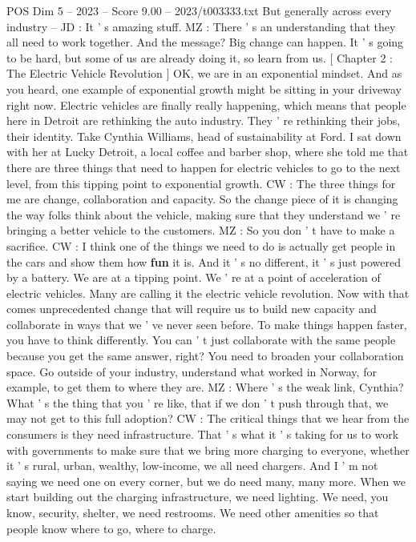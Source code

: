 \begin{textsample}{POS Dim 5 – 2023 – Score 9.00 – 2023/t003333.txt}
But generally across every industry -- JD : It ' s amazing stuff.
MZ : There ' s an understanding that they all need to work together.
And the message?
Big change can happen.
It ' s going to be hard, but some of us are already doing it, so learn from us. [ Chapter 2 : The Electric Vehicle Revolution ] OK, we are in an exponential mindset.
And as you heard, one example of exponential growth might be sitting in your driveway right now.
Electric vehicles are finally really happening, which means that people here in Detroit are rethinking the auto industry.
They ' re rethinking their jobs, their identity.
Take Cynthia Williams, head of sustainability at Ford.
I sat down with her at Lucky Detroit, a local coffee and barber shop, where she told me that there are three things that need to happen for electric vehicles to go to the next level, from this tipping point to exponential growth.
CW : The three things for me are change, collaboration and capacity.
So the change piece of it is changing the way folks think about the vehicle, making sure that they understand we ' re bringing a better vehicle to the customers.
MZ : So you don ' t have to make a sacrifice.
CW : I think one of the things we need to do is actually get people in the cars and show them how \textbf{fun} it is.
And it ' s no different, it ' s just powered by a battery.
We are at a tipping point.
We ' re at a point of acceleration of electric vehicles.
Many are calling it the electric vehicle revolution.
Now with that comes unprecedented change that will require us to build new capacity and collaborate in ways that we ' ve never seen before.
To make things happen faster, you have to think differently.
You can ' t just collaborate with the same people because you get the same answer, right?
You need to broaden your collaboration space.
Go outside of your industry, understand what worked in Norway, for example, to get them to where they are.
MZ : Where ' s the weak link, Cynthia?
What ' s the thing that you ' re like, that if we don ' t push through that, we may not get to this full adoption?
CW : The critical things that we hear from the consumers is they need infrastructure.
That ' s what it ' s taking for us to work with governments to make sure that we bring more charging to everyone, whether it ' s rural, urban, wealthy, low-income, we all need chargers.
And I ' m not saying we need one on every corner, but we do need many, many more.
When we start building out the charging infrastructure, we need lighting.
We need, you know, security, shelter, we need restrooms.
We need other amenities so that people know where to go, where to charge.

\end{textsample}
